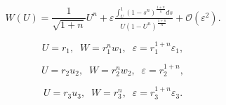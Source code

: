\documentclass[10pt,a4paper]{amsart}
\begin{document}
\begin{equation}
    W(U)=\frac{1}{\sqrt{1+n}}U^n+\varepsilon \tfrac{\int_U^1(1-s^n)^{\frac{1+n}{n}}ds}{U(1-U^n)^{\tfrac{1+n}{n}}}+\mathcal{O}(\varepsilon^2).
    \label{perturbed orbit}
\end{equation}

\begin{equation}
    U=r_1, \;\; W=r_1^nw_1,\;\; \varepsilon=r_1^{1+n}\varepsilon_1,
    \label{blow-up in K1}
\end{equation}

\begin{equation}
    U=r_2u_2, \;\; W=r_2^nw_2,\;\; \varepsilon=r_2^{1+n},
    \label{blow-up in K2}
\end{equation}

\begin{equation}
    U=r_3u_3, \;\; W=r_3^n,\;\; \varepsilon=r_3^{1+n}\varepsilon_3.
    \label{blow-up in K3}
\end{equation}
\end{document}

